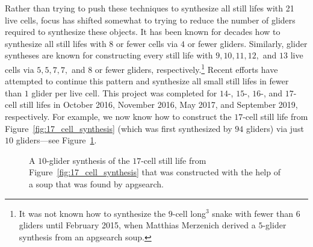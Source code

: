 Rather than trying to push these techniques to synthesize all still lifes with 21 live cells, focus has shifted somewhat to trying to reduce the number of gliders required to synthesize these objects. It has been known for decades how to synthesize all still lifes with $8$ or fewer cells via $4$ or fewer gliders. Similarly, glider syntheses are known for constructing every still life with $9, 10, 11, 12,$ and $13$ live cells via $5, 5, 7, 7,$ and $8$ or fewer gliders, respectively.\footnote{It was not known how to synthesize the $9$-cell long$^3$ snake with fewer than $6$ gliders until February 2015, when Matthias Merzenich derived a $5$-glider synthesis from an apgsearch soup.} Recent efforts have attempted to continue this pattern and synthesize all small still lifes in fewer than $1$ glider per live cell. This project was completed for $14$-, $15$-, $16$-, and $17$-cell still lifes in October 2016, November 2016, May 2017, and September 2019, respectively. For example, we now know how to construct the $17$-cell still life from Figure~\ref{fig:17_cell_synthesis} (which was first synthesized by $94$ gliders) via just $10$ gliders---see Figure~\ref{fig:17_cell_synthesis_small}.

\begin{figure}[!htb]
	\centering
	\caption{A $10$-glider synthesis of the $17$-cell still life from Figure~\ref{fig:17_cell_synthesis} that was constructed with the help of a soup that was found by apgsearch.}\label{fig:17_cell_synthesis_small}
\end{figure}

